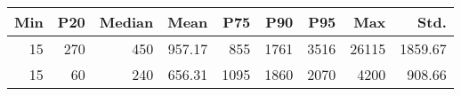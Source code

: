 
\begin{tabular}{r|r|r|r|r|r|r|r|r}
\hline
Min & P20 & Median & Mean & P75 & P90 & P95 & Max & Std.\\
\hline
15 & 270 & 450 & 957.17 & 855 & 1761 & 3516 & 26115 & 1859.67\\
\hline
15 & 60 & 240 & 656.31 & 1095 & 1860 & 2070 & 4200 & 908.66\\
\hline
\end{tabular}
